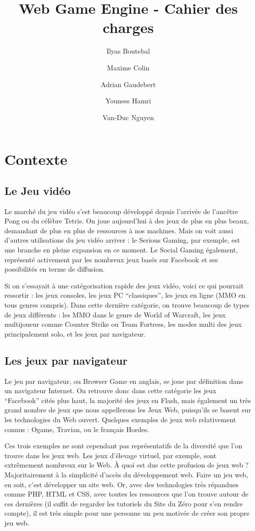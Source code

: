 \documentclass[a4paper,10pt]{report}
\title{Web Game Engine - Cahier des charges}
\author{Ilyas Boutebal \and Maxime Colin \and Adrian Gaudebert \and Youness Hamri \and Van-Duc Nguyen}
\begin{document}
\maketitle

\tableofcontents



\chapter{Contexte}

  \section{Le Jeu vidéo}

    Le marché du jeu vidéo s’est beaucoup développé depuis l’arrivée de l’ancêtre Pong ou du célèbre Tetris. On joue aujourd’hui à des jeux de plus en plus beaux, demandant de plus en plus de ressources à nos machines. Mais on voit aussi d’autres utilisations du jeu vidéo arriver : le Serious Gaming, par exemple, est une branche en pleine expansion en ce moment. Le Social Gaming également, représenté activement par les nombreux jeux basés sur Facebook et ses possibilités en terme de diffusion.

    Si on s’essayait à une catégorisation rapide des jeux vidéo, voici ce qui pourrait ressortir : les jeux consoles, les jeux PC “classiques”, les jeux en ligne (MMO en tous genres compris). Dans cette dernière catégorie, on trouve beaucoup de types de jeux différents : les MMO dans le genre de World of Warcraft, les jeux multijoueur comme Counter Strike ou Team Fortress, les modes multi des jeux principalement solo, et les jeux par navigateur.

  \section{Les jeux par navigateur}

    Le jeu par navigateur, ou Browser Game en anglais, se joue par définition dans un navigateur Internet. On retrouve donc dans cette catégorie les jeux “Facebook” cités plus haut, la majorité des jeux en Flash, mais également un très grand nombre de jeux que nous appellerons les Jeux Web, puisqu’ils se basent sur les technologies du Web ouvert. Quelques exemples de jeux web relativement connus : Ogame, Travian, ou le français Hordes.

    Ces trois exemples ne sont cependant pas représentatifs de la diversité que l’on trouve dans les jeux web. Les jeux d’élevage virtuel, par exemple, sont extrêmement nombreux sur le Web. À quoi est due cette profusion de jeux web ? Majoritairement à la simplicité d’accès du développement web. Faire un jeu web, en soit, c’est développer un site web. Or, avec des technologies très répandues comme PHP, HTML et CSS, avec toutes les ressources que l’on trouve autour de ces dernières (il suffit de regarder les tutoriels du Site du Zéro pour s’en rendre compte), il est très simple pour une personne un peu motivée de créer son propre jeu web.
\end{document}
